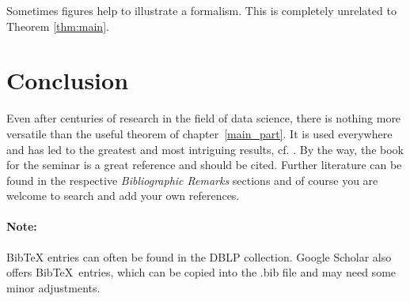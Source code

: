 \documentclass[a4paper,12pt]{article}
\begin{document}
Sometimes figures help to illustrate a formalism. This is completely unrelated to Theorem \ref{thm:main}.

\section{Conclusion}
\label{conclusions}

Even after centuries of research in the field of data science, 
there is nothing more versatile than the useful theorem of chapter~\ref{main_part}. 
It is used everywhere and has led to the greatest and most intriguing results, cf. \cite{Someone03}. 
By the way, the book for the seminar \cite{SSBD14} is a great reference and should be cited.
Further literature can be found in the respective \emph{Bibliographic Remarks} sections and 
of course you are welcome to search and add your own references.

\paragraph*{Note:} Bib{\TeX} entries can often be found in the DBLP collection. 
Google Scholar also offers Bib\TeX~entries, which can be copied into the .bib file and may need some minor adjustments.


\nolinenumbers
\footnotesize

\end{document}
